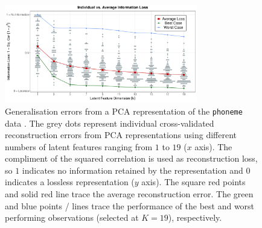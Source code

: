 \begin{figure}
    \centering
    \includegraphics[width=0.75\textwidth]{figures/info-loss.pdf}
    \caption{Generalisation errors from a PCA representation of the \texttt{phoneme} data \parencite{hastie_elements_2009}. The grey dots represent individual cross-validated reconstruction errors from PCA representations using different numbers of latent features ranging from $1$ to $19$ ($x$ axis). 
    The compliment of the squared correlation is used as reconstruction loss, so $1$ indicates no information retained by the representation and $0$ indicates a lossless representation ($y$ axis).
    The square red points and solid red line trace the average reconstruction error. The green and blue points / lines trace the performance of the best and worst performing observations (selected at $K=19$), respectively.}
    \label{fig:ind-losses}
\end{figure}


